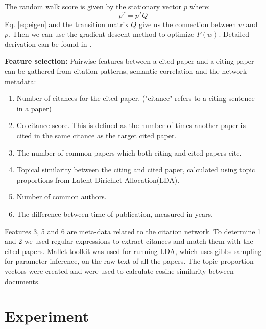 \documentclass{article} %
\begin{document}
The random walk score is given by the stationary vector $p$ where:
\begin{equation}
\label{eq:eigen}
p^T = p^TQ
\end{equation} 
	Eq. \ref{eq:eigen} and the transition matrix $Q$ give us the connection between $w$ and $p$. Then we can use the gradient descent method to optimize $F(w)$. Detailed derivation can be found in \cite{Backstrom:2011:SRW:1935826.1935914}.  

	\textbf{Feature selection:} Pairwise features  between a cited paper and a citing paper can be gathered from citation patterns, semantic correlation and the network metadata:
\begin{enumerate}
  \item Number of citances for the cited paper. ("citance" refers to a citing sentence in a paper)
  \item Co-citance score. This is defined as the number of times another paper is cited in the same citance as the target cited paper.
  \item The number of common papers which both citing and cited papers cite.
  \item Topical similarity between the citing and cited paper, calculated using topic proportions from Latent Dirichlet Allocation(LDA).
  \item Number of common authors.
  \item The difference between time of publication, measured in years.
\end{enumerate}
Features 3, 5 and 6 are meta-data related to the citation network. To determine 1 and 2 we used regular expressions to extract citances and match them with the cited papers. Mallet toolkit \cite{mallet} was used for running LDA, which uses gibbs sampling for parameter inference, on the raw text of all the papers. The topic proportion vectors were created and were used to calculate cosine similarity between documents.

\section{Experiment} 
\end{document}
